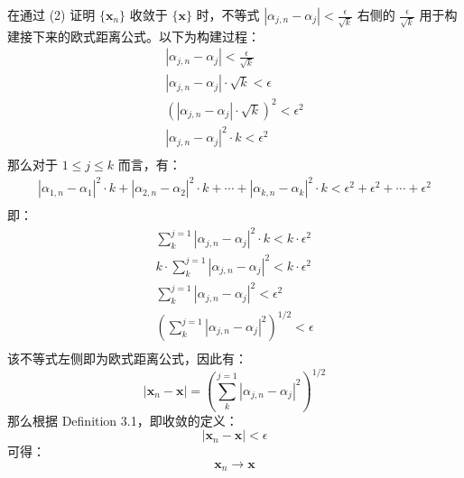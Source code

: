\documentclass[../poma-notes.tex]{subfiles}
\begin{document}
\begin{anote}
  在通过 (2) 证明 $\{\mathbf{x}_n\}$ 收敛于 $\{\mathbf{x}\}$ 时，不等式 $|\alpha_{j,n} - \alpha_j| < \frac{\epsilon}{\sqrt{k}}$
  右侧的 $\frac{\epsilon}{\sqrt{k}}$ 用于构建接下来的欧式距离公式。以下为构建过程：
  \begin{align*}
    |\alpha_{j,n} - \alpha_j| < \frac{\epsilon}{\sqrt{k}}     \\
    |\alpha_{j,n} - \alpha_j| \cdot \sqrt{k} < \epsilon       \\
    (|\alpha_{j,n} - \alpha_j| \cdot \sqrt{k})^2 < \epsilon^2 \\
    |\alpha_{j,n} - \alpha_j|^2 \cdot k < \epsilon^2          \\
  \end{align*}
  那么对于 $1 \le j \le k$ 而言，有：
  \begin{align*}
    |\alpha_{1,n} - \alpha_1|^2 \cdot k +
    |\alpha_{2,n} - \alpha_2|^2 \cdot k +
    \cdots +
    |\alpha_{k,n} - \alpha_k|^2 \cdot k <
    \epsilon^2 + \epsilon^2 + \cdots + \epsilon^2 \\
  \end{align*}
  即：
  \begin{align*}
    \sum_{k}^{j=1} |\alpha_{j,n} - \alpha_j|^2 \cdot k < k \cdot \epsilon^2 \\
    k \cdot \sum_{k}^{j=1} |\alpha_{j,n} - \alpha_j|^2 < k \cdot \epsilon^2 \\
    \sum_{k}^{j=1} |\alpha_{j,n} - \alpha_j|^2 <  \epsilon^2                \\
    (\sum_{k}^{j=1} |\alpha_{j,n} - \alpha_j|^2)^{1/2} <  \epsilon          \\
  \end{align*}
  该不等式左侧即为欧式距离公式，因此有：
  \[|\mathbf{x}_n - \mathbf{x}| = (\sum_{k}^{j=1} |\alpha_{j,n} - \alpha_j|^2)^{1/2}\]
  那么根据 Definition 3.1，即收敛的定义：
  \[|\mathbf{x}_n - \mathbf{x}| < \epsilon \]
  可得：
  \[\mathbf{x}_n \to \mathbf{x}\]
\end{anote}
\end{document}
